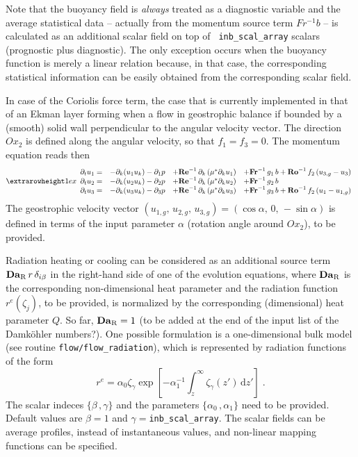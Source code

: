 Note that the buoyancy field is {\it always} treated as a diagnostic variable
and the average statistical data -- actually from the momentum source term
$Fr^{-1}b$ -- is calculated as an additional scalar field on top of {\tt
  inb\_scal\_array} scalars (prognostic plus diagnostic). The only exception
occurs when the buoyancy function is merely a linear relation because, in that
case, the corresponding statistical information can be easily obtained from the
corresponding scalar field.

In case of the Coriolis force term, the case that is currently implemented in
that of an Ekman layer forming when a flow in geostrophic balance if bounded by
a (smooth) solid wall perpendicular to the angular velocity vector. The
direction $Ox_2$ is defined along the angular velocity, so that $f_1=f_3=0$. The
momentum equation reads then
\begin{equation}
\setlength{\extrarowheight}{1ex}
\begin{array}{rlll}
  \partial_t  u_1 =& 
  -\partial_k ( u_1 u_k ) -\partial_1 p &
  +\mathrm{\bf Re}^{-1}\,\partial_k  \left( \mu^{*} \partial_k u_1\right) &
  +\mathrm{\bf Fr}^{-1}\, g_1\,b+\mathrm{\bf Ro}^{-1}\,f_2\,(u_{3,g}-u_3) \\
  \partial_t  u_2 =& 
  -\partial_k ( u_2 u_k ) -\partial_2 p &
  +\mathrm{\bf Re}^{-1}\,\partial_k  \left( \mu^{*} \partial_k u_2\right) &
  +\mathrm{\bf Fr}^{-1}\, g_2\,b \\
  \partial_t  u_3 =& 
  -\partial_k ( u_3 u_k ) -\partial_3 p &
  +\mathrm{\bf Re}^{-1}\,\partial_k  \left( \mu^{*} \partial_k u_3\right) &
  +\mathrm{\bf Fr}^{-1}\, g_3\,b+\mathrm{\bf Ro}^{-1}\,f_2\,(u_1-u_{1,g}) 
\end{array}
\end{equation}
The geostrophic velocity vector $(u_{1,g},\,u_{2,g},\,u_{3,g}) =
(\cos\alpha,\,0,\,-\sin\alpha)$ is defined in terms of the input parameter
$\alpha$ (rotation angle around $Ox_2$), to be provided.

Radiation heating or cooling can be considered as an additional source term
$\mathrm{\bf Da}_\mathrm{R}\,r\,\delta_{i\beta}$ in the right-hand side of one
of the evolution equations, where $\mathrm{\bf Da}_\mathrm{R}$ is the
corresponding non-dimensional heat parameter and the radiation function
$r^e(\zeta_j)$, to be provided, is normalized by the corresponding (dimensional)
heat parameter $Q$. So far, $\mathrm{\bf Da}_\mathrm{R}=1$ (to be added at the
end of the input list of the Damk{\"o}hler numbers?). One possible formulation
is a one-dimensional bulk model (see routine {\tt flow/flow\_radiation}), which
is represented by radiation functions of the form
\begin{equation}
r^e=\alpha_0 \zeta_{\gamma}\exp\left[
-\alpha_1^{-1}\int_z^\infty\zeta_{\gamma}(z')\,\mathrm{d}z'\right] \;.
\end{equation}
The scalar indeces $\{\beta\,,\gamma\}$ and the parameters $\{\alpha_0\,,\alpha_1\}$ need to be
provided. Default values are $\beta=1$ and $\gamma=${\tt inb\_scal\_array}. The scalar fields can be average profiles,
instead of instantaneous values, and non-linear mapping functions can be
specified.

